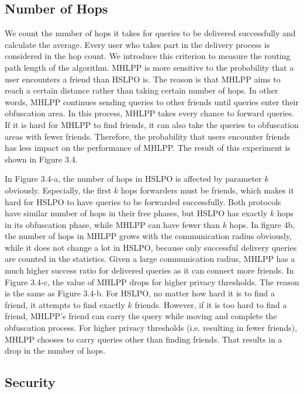 \subsection{ Number of Hops}

\noindent We count the number of hops it takes for queries to be delivered successfully and calculate the average. Every user who takes part in the delivery process is considered in the hop count. We introduce this criterion to measure the routing path length of the algorithm. MHLPP is more sensitive to the probability that a user encounters a friend than HSLPO is. The reason is that MHLPP aims to reach a certain distance rather than taking certain number of hops. In other words, MHLPP continues sending queries to other friends until queries enter their obfuscation area. In this process, MHLPP takes every chance to forward queries. If it is hard for MHLPP to find friends, it can also take the queries to obfuscation areas with fewer friends. Therefore, the probability that users encounter friends has less impact on the performance of MHLPP. The result of this experiment is shown in Figure 3.4.

\noindent In Figure 3.4-a, the number of hops in HSLPO is affected by parameter $k$ obviously. Especially, the first $k$ hops forwarders must be friends, which makes it hard for HSLPO to have queries to be forwarded successfully. Both protocols have similar number of hops in their free phases, but HSLPO has exactly $k$ hops in its obfuscation phase, while MHLPP can have fewer than $k$ hops. In figure 4b, the number of hops in MHLPP grows with the communication radius obviously, while it does not change a lot in HSLPO, because only successful delivery queries are counted in the statistics. Given a large communication radius, MHLPP has a much higher success ratio for delivered queries as it can connect more friends. In Figure 3.4-c, the value of MHLPP drops for higher privacy thresholds. The reason is the same as Figure 3.4-b. For HSLPO, no matter how hard it is to find a friend, it attempts to find exactly $k$ friends. However, if it is too hard to find a friend, MHLPP's friend can carry the query while moving and complete the obfuscation process. For higher privacy thresholds (i.e. resulting in fewer friends), MHLPP chooses to carry queries other than finding friends. That results in a drop in the number of hops.


\subsection{ Security}

